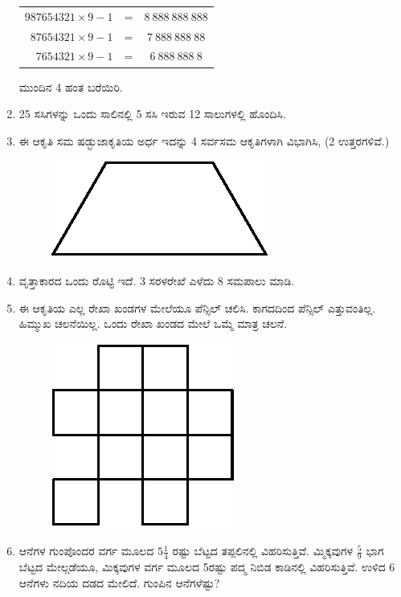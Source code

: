 \begin{enumerate}
\begin{tabular}[t]{rcc}
$987654321\times 9 - 1$ & = &  $8~888~888~888$\\
$87654321\times 9 - 1$ & = &  $7~888~888~88$\\
$7654321\times 9 - 1$ & = &  $6~888~888~8$
\end{tabular}

\vskip 0.1cm

ಮುಂದಿನ 4 ಹಂತ ಬರೆಯಿರಿ. 

\item 25 ಸಸಿಗಳನ್ನು ಒಂದು ಸಾಲಿನಲ್ಲಿ 5 ಸಸಿ ಇರುವ 12 ಸಾಲುಗಳಲ್ಲಿ ಹೊಂದಿಸಿ. 

\item ಈ ಆಕೃತಿ ಸಮ ಷಡ್ಭುಜಾಕೃತಿಯ ಅರ್ಧ ಇದನ್ನು 4 ಸರ್ವಸಮ ಆಕೃತಿಗಳಾಗಿ ವಿಭಾಗಿಸಿ, (2 ಉತ್ತರಗಳಿವೆ.)
\begin{figure}[H]
\centering
\includegraphics{images/chap9/q21.eps}
\end{figure}

\item ವೃತ್ತಾಕಾರದ ಒಂದು ರೊಟ್ಟಿ ಇದೆ. 3 ಸರಳರೇಖೆ ಎಳೆದು 8 ಸಮಪಾಲು ಮಾಡಿ. 

\item ಈ ಆಕೃತಿಯ ಎಲ್ಲ ರೇಖಾ ಖಂಡಗಳ ಮೇಲೆಯೂ ಪೆನ್ಸಿಲ್ ಚಲಿಸಿ. ಕಾಗದದಿಂದ ಪೆನ್ಸಿಲ್ ಎತ್ತುವಂತಿಲ್ಲ. ಹಿಮ್ಮುಖ ಚಲನೆಯಿಲ್ಲ. ಒಂದು ರೇಖಾ ಖಂಡದ ಮೇಲೆ ಒಮ್ಮೆ ಮಾತ್ರ ಚಲನೆ. 
\begin{figure}[H]
\centering
\includegraphics{images/chap9/q23.eps}
\end{figure}

\item ಆನೆಗಳ ಗುಂಪೊಂದರ ವರ್ಗ ಮೂಲದ $5\frac{1}{4}$ ರಷ್ಟು ಬೆಟ್ಟದ ತಪ್ಪಲಿನಲ್ಲಿ ವಿಹರಿಸುತ್ತಿವೆ. ಮ್ಮಿಕ್ಕವುಗಳ $\frac{5}{9}$ ಭಾಗ ಬೆಟ್ಟದ ಮೇಲ್ಗಡೆಯೂ, ಮಿಕ್ಕವುಗಳ ವರ್ಗ ಮೂಲದ 5ರಷ್ಟು ಪದ್ಮ ನಿಬಿಡ ಕಾಡಿನಲ್ಲಿ ವಿಹರಿಸುತ್ತಿವೆ. ಉಳಿದ 6 ಆನೆಗಳು ನದಿಯ ದಡದ ಮೇಲಿದೆ. ಗುಂಪಿನ ಆನೆಗಳೆಷ್ಟು? 


\end{enumerate}
